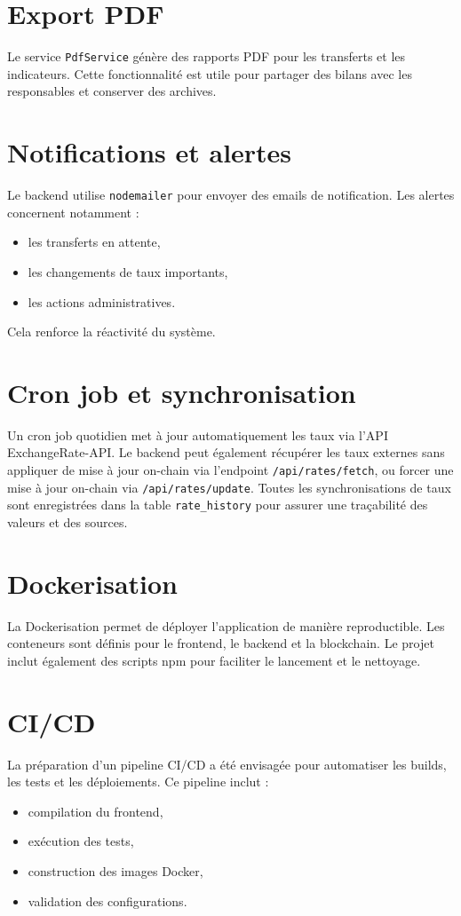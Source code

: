 \documentclass[a4paper,12pt]{report}
\begin{document}
\section{Export PDF}
Le service \texttt{PdfService} génère des rapports PDF pour les transferts et les indicateurs. Cette fonctionnalité est utile pour partager des bilans avec les responsables et conserver des archives.

\section{Notifications et alertes}
Le backend utilise \texttt{nodemailer} pour envoyer des emails de notification. Les alertes concernent notamment :
\begin{itemize}[leftmargin=*,nosep]
  \item les transferts en attente,
  \item les changements de taux importants,
  \item les actions administratives.
\end{itemize}
Cela renforce la réactivité du système.

\section{Cron job et synchronisation}
Un cron job quotidien met à jour automatiquement les taux via l'API ExchangeRate-API. Le backend peut également récupérer les taux externes sans appliquer de mise à jour on-chain via l'endpoint \texttt{/api/rates/fetch}, ou forcer une mise à jour on-chain via \texttt{/api/rates/update}. Toutes les synchronisations de taux sont enregistrées dans la table \texttt{rate\_history} pour assurer une traçabilité des valeurs et des sources.

\section{Dockerisation}
La Dockerisation permet de déployer l'application de manière reproductible. Les conteneurs sont définis pour le frontend, le backend et la blockchain. Le projet inclut également des scripts npm pour faciliter le lancement et le nettoyage.

\section{CI/CD}
La préparation d'un pipeline CI/CD a été envisagée pour automatiser les builds, les tests et les déploiements. Ce pipeline inclut :
\begin{itemize}[leftmargin=*,nosep]
  \item compilation du frontend,
  \item exécution des tests,
  \item construction des images Docker,
  \item validation des configurations.
\end{itemize}
\end{document}
